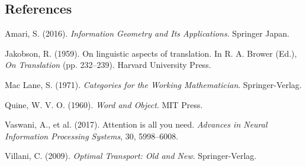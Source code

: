 \documentclass[11pt,letterpaper]{article}
\begin{document}
\subsection*{References}
\begin{enumerate}[label={[\arabic*]},noitemsep,topsep=1pt]
\small
\item Amari, S. (2016). \textit{Information Geometry and Its Applications}. Springer Japan.
\item Jakobson, R. (1959). On linguistic aspects of translation. In R. A. Brower (Ed.), \textit{On Translation} (pp. 232--239). Harvard University Press.
\item Mac Lane, S. (1971). \textit{Categories for the Working Mathematician}. Springer-Verlag.
\item Quine, W. V. O. (1960). \textit{Word and Object}. MIT Press.
\item Vaswani, A., et al. (2017). Attention is all you need. \textit{Advances in Neural Information Processing Systems}, 30, 5998--6008.
\item Villani, C. (2009). \textit{Optimal Transport: Old and New}. Springer-Verlag.
\end{enumerate}
\end{document}
